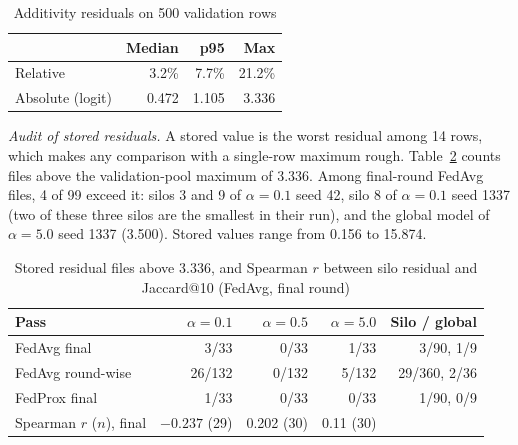 \begin{table}[h]
\centering
\caption{Additivity residuals on 500 validation rows} %
\label{tab:valpool}
\footnotesize
\begin{tabular}{@{}lrrr@{}}
\toprule
 & Median & p95 & Max\\ %
\midrule
Relative & 3.2\% & 7.7\% & 21.2\%\\ %
Absolute (logit) & 0.472 & 1.105 & 3.336\\ %
\bottomrule
\end{tabular}
\end{table}

\emph{Audit of stored residuals.} A stored value is the worst residual among 14 rows, %
which makes any comparison with a single-row maximum rough. Table~\ref{tab:residaudit} %
counts files above the validation-pool maximum of 3.336. Among final-round FedAvg files, %
4 of 99 exceed it: silos 3 and 9 of $\alpha=0.1$ seed 42, silo 8 of $\alpha=0.1$ seed %
1337 (two of these three silos are the smallest in their run), and the global %
model of $\alpha=5.0$ seed 1337 (3.500). Stored values range from 0.156 to 15.874. %

\begin{table}[h]
\centering
\caption{Stored residual files above 3.336, and Spearman $r$ between silo residual and Jaccard@10 (FedAvg, final round)} %
\label{tab:residaudit}
\footnotesize
\setlength{\tabcolsep}{2.5pt}
\begin{tabular}{@{}lrrrr@{}}
\toprule
Pass & $\alpha=0.1$ & $\alpha=0.5$ & $\alpha=5.0$ & Silo / global\\ %
\midrule
FedAvg final & 3/33 & 0/33 & 1/33 & 3/90, 1/9\\ %
FedAvg round-wise & 26/132 & 0/132 & 5/132 & 29/360, 2/36\\ %
FedProx final & 1/33 & 0/33 & 0/33 & 1/90, 0/9\\ %
\midrule
Spearman $r$ ($n$), final & $-0.237$ (29) & 0.202 (30) & 0.11 (30) & \\ %
\bottomrule
\end{tabular}
\end{table}

